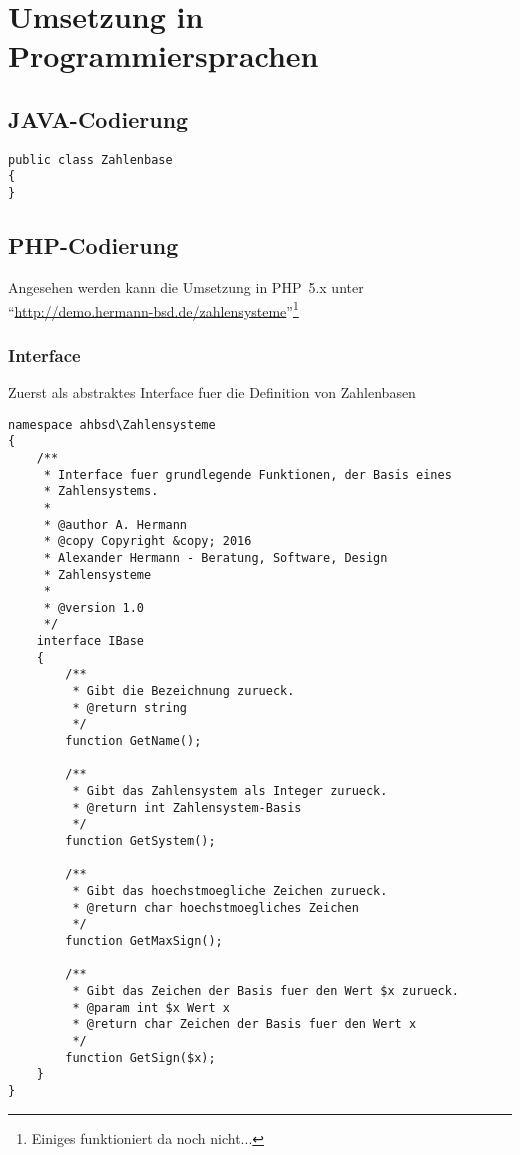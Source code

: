 \chapter{Umsetzung in Programmiersprachen}
\section{JAVA-Codierung}
\label{listing:JAVA}
\begin{lstlisting}
public class Zahlenbase
{
}	
\end{lstlisting}
\section{PHP-Codierung}
Angesehen werden kann die Umsetzung in PHP~5.x unter 
"`\href{http://demo.hermann-bsd.de/zahlensysteme/}{http://demo.hermann-bsd.de/zahlensysteme}"'\footnote{Einiges funktioniert da noch nicht...}
\subsection{Interface}
Zuerst als abstraktes Interface fuer die Definition von Zahlenbasen
\label{listing:PHP:Interface}
\begin{lstlisting}
namespace ahbsd\Zahlensysteme
{
	/**
	 * Interface fuer grundlegende Funktionen, der Basis eines 
	 * Zahlensystems.
	 * 
	 * @author A. Hermann
	 * @copy Copyright &copy; 2016 
	 * Alexander Hermann - Beratung, Software, Design
	 * Zahlensysteme
	 *
	 * @version 1.0
	 */
	interface IBase
	{
		/**
		 * Gibt die Bezeichnung zurueck.
		 * @return string
		 */
		function GetName();
		
		/**
		 * Gibt das Zahlensystem als Integer zurueck.
		 * @return int Zahlensystem-Basis
		 */
		function GetSystem();
		
		/**
		 * Gibt das hoechstmoegliche Zeichen zurueck.
		 * @return char hoechstmoegliches Zeichen
		 */
		function GetMaxSign();
		
		/**
		 * Gibt das Zeichen der Basis fuer den Wert $x zurueck.
		 * @param int $x Wert x
		 * @return char Zeichen der Basis fuer den Wert x
		 */
		function GetSign($x);
	}
}
\end{lstlisting}
